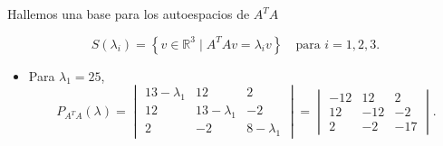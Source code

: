 \begin{frame}
\begin{solution}
		Hallemos una base para los autoespacios de $A^{T}A$

		\begin{equation*}
			S\left(\lambda_{i}\right)=
			\left\{
			v\in\mathbb{R}^{3}\mid
			A^{T}Av=\lambda_{i}v
			\right\}\quad\text{para $i=1,2,3$}.
		\end{equation*}
	\end{solution}

	\begin{itemize}
		\item

		      Para $\lambda_{1}=25$,
		      \begin{equation*}
			      P_{A^{T}A}
			      \left(\lambda\right)=
			      \begin{vmatrix}
				      13 - \lambda_{1} & 12               & 2               \\
				      12               & 13 - \lambda_{1} & -2              \\
				      2                & -2               & 8 - \lambda_{1}
			      \end{vmatrix} =
			      \begin{vmatrix}
				      -12 & 12  & 2   \\
				      12  & -12 & -2  \\
				      2   & -2  & -17
			      \end{vmatrix}.
		      \end{equation*}
	\end{itemize}
\end{frame}


